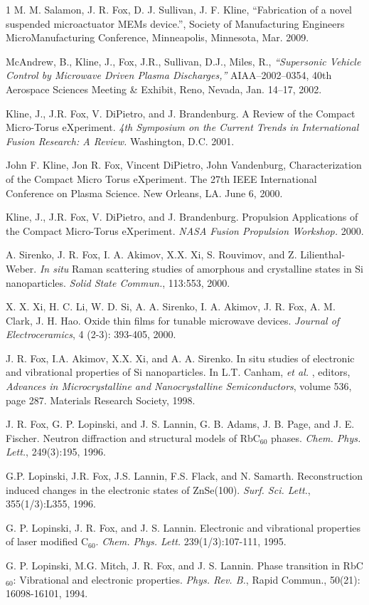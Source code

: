 \documentclass[american]{cv}
\begin{document}
\begin{thebibliography}{1}
 M. M. Salamon, J. R. Fox, D. J. Sullivan, J. F. Kline,  ``Fabrication of a novel suspended microactuator MEMs device.'', Society of Manufacturing Engineers MicroManufacturing Conference,  Minneapolis, Minnesota, Mar. 2009.

 McAndrew, B., Kline, J., Fox, J.R., Sullivan, D.J., Miles,
R., \textit{``Supersonic Vehicle Control by Microwave Driven Plasma
Discharges,''} AIAA--2002--0354, 40th Aerospace Sciences Meeting \& Exhibit,
Reno, Nevada, Jan. 14--17, 2002.

 Kline, J., J.R. Fox, V. DiPietro, and J. Brandenburg.  A Review
of the Compact Micro-Torus eXperiment. \emph{4th Symposium on the
Current Trends in International Fusion Research: A Review.} Washington,
D.C. 2001.

 John F. Kline, Jon R.
Fox, Vincent DiPietro, John Vandenburg, Characterization of the Compact
Micro Torus eXperiment. The 27th IEEE International Conference on Plasma
Science. New Orleans, LA. June 6, 2000.

 Kline, J., J.R. Fox, V. DiPietro, and J.
Brandenburg.  Propulsion Applications of the Compact Micro-Torus
eXperiment. \emph{NASA Fusion Propulsion Workshop.} 2000.

 A. Sirenko, J. R. Fox, I. A. Akimov, X.X. Xi, S. Rouvimov, and Z.
Lilienthal-Weber. \emph{In situ} Raman scattering studies of amorphous
and crystalline states in Si nanoparticles. \emph{Solid State Commun.},
113:553, 2000.

 X. X. Xi, H. C. Li, W. D. Si, A. A. Sirenko, I. A. Akimov,
J. R. Fox, A. M. Clark, J. H. Hao. Oxide thin films for tunable microwave
devices. \emph{Journal of Electroceramics}, 4 (2-3): 393-405, 2000.

 J. R. Fox, I.A. Akimov, X.X. Xi, and A. A. Sirenko. In situ studies
of electronic and vibrational properties of Si nanoparticles. In L.T.
Canham, \emph{et al.} , editors, \emph{Advances in Microcrystalline
and Nanocrystalline Semiconductors}, volume 536, page 287. Materials
Research Society, 1998.

J. R. Fox, G. P. Lopinski, and J. S. Lannin, G. B. Adams, J. B. Page,
and J. E. Fischer. Neutron diffraction and structural models of RbC\( _{60} \)
phases. \emph{Chem. Phys. Lett.}, 249(3):195, 1996.

 G.P. Lopinski, J.R. Fox, J.S. Lannin, F.S. Flack, and N. Samarth.
Reconstruction induced changes in the electronic states of ZnSe(100).
\emph{Surf. Sci. Lett.}, 355(1/3):L355, 1996.

 G. P. Lopinski, J. R. Fox, and J. S. Lannin. Electronic and vibrational
properties of laser modified C\( _{60} \). \emph{Chem. Phys. Lett.}
239(1/3):107-111, 1995.

 G. P. Lopinski, M.G. Mitch, J. R. Fox, and J. S. Lannin. Phase transition
in RbC\( _{60} \): Vibrational and electronic properties. \emph{Phys.
Rev. B.}, Rapid Commun., 50(21): 16098-16101, 1994.

\end{thebibliography}
\end{document}
